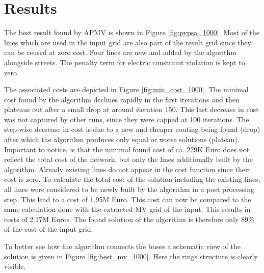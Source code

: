 %

\section{Results}



The best result found by APMV is shown in Figure \ref{fig:pypsa_1000}. Most of the lines which are used in the input grid are also part of the result grid since they can be reused at zero cost. Four lines are new and added by the algorithm alongside streets. The penalty term for electric constraint violation is kept to zero.



The associated costs are depicted in Figure \ref{fig:min_cost_1000}. The minimal cost found by the algorithm declines rapidly in the first iterations and then plateaus out after a small drop at around iteration 150. This last decrease in cost was not captured by other runs, since they were capped at 100 iterations. The step-wise decrease in cost is due to a new and cheaper routing being found (drop) after which the algorithm produces only equal or worse solutions (plateau). Important to notice, is that the minimal found cost of ca. 229K Euro does not reflect the total cost of the network, but only the lines additionally built by the algorithm. Already existing lines do not appear in the cost function since their cost is zero. To calculate the total cost of the solution including the existing lines, all lines were considered to be newly built by the algorithm in a post processing step. This lead to a cost of 1.95M Euro. This cost can now be compared to the same calculation done with the extracted MV grid of the input. This results in costs of 2.17M Euros. The found solution of the algorithm is therefore only 89\% of the cost of the input grid.





To better see how the algorithm connects the buses a schematic view of the solution is given in Figure \ref{fig:best_mv_1000}. Here the rings structure is clearly visible. 





